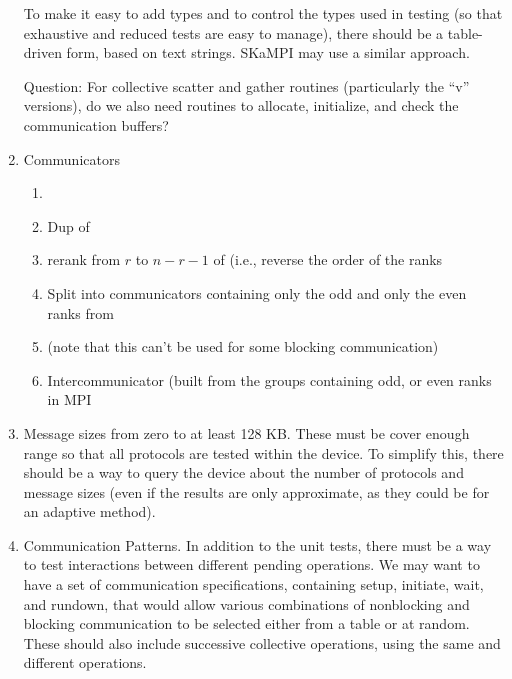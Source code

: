 \documentclass{article}
\begin{document}
\begin{enumerate}
     To make it easy to add types and to control the types used in
     testing (so that exhaustive and reduced tests are easy to
     manage), there should be a table-driven form, based on text
     strings.  SKaMPI may use a similar approach.

     Question:  For collective scatter and gather routines
     (particularly the ``v'' versions), do we also need routines to
     allocate, initialize, and check the communication buffers?

\item Communicators
    \begin{enumerate}
    \item {}
    \item Dup of 
    \item rerank from $r$ to $n-r-1$ of  (i.e.,
    reverse the order of the ranks
    \item Split into communicators containing only the odd and only
    the even ranks from 
    \item {} (note that this can't be used for some
    blocking communication)
    \item Intercommunicator (built from the groups containing odd,
or even ranks in MPI 
    \end{enumerate}

\item Message sizes from zero to at least 128 KB.  These must be cover
enough range so that all protocols are tested within the device.  To
simplify this, there should be a way to query the device about the
number of protocols and message sizes (even if the results are only
approximate, as they could be for an adaptive method).

\item Communication Patterns.
In addition to the unit tests, there must be a way to test
interactions between different pending operations.  We may want to
have a set of communication specifications, containing setup,
initiate, wait, and rundown, that would allow various combinations of
nonblocking and blocking communication to be selected either from a
table or at random.  These should also include successive collective
operations, using the same and different operations.

\end{enumerate}


\end{document}
